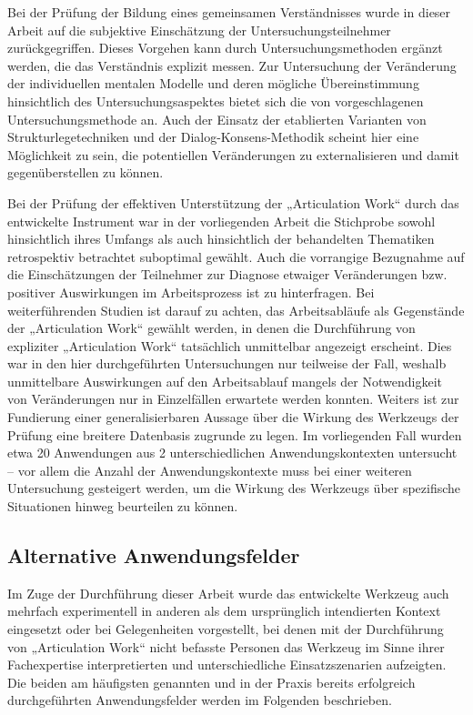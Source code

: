 Bei der Prüfung der Bildung eines gemeinsamen Verständnisses wurde in dieser Arbeit auf die subjektive Einschätzung der Untersuchungsteilnehmer zurückgegriffen. Dieses Vorgehen kann durch Untersuchungsmethoden ergänzt werden, die das Verständnis explizit messen. Zur Untersuchung der Veränderung der individuellen mentalen Modelle und deren mögliche Übereinstimmung hinsichtlich des Untersuchungsaspektes bietet sich die von \citep{Ifenthaler06} vorgeschlagenen Untersuchungsmethode an. Auch der Einsatz der etablierten Varianten von Strukturlegetechniken und der Dialog-Konsens-Methodik scheint hier eine Möglichkeit zu sein, die potentiellen Veränderungen zu externalisieren und damit gegenüberstellen zu können.

Bei der Prüfung der effektiven Unterstützung der „Articulation Work“ durch das entwickelte Instrument war in der vorliegenden Arbeit die Stichprobe sowohl hinsichtlich ihres Umfangs als auch hinsichtlich der behandelten Thematiken retrospektiv betrachtet suboptimal gewählt. Auch die vorrangige Bezugnahme auf die Einschätzungen der Teilnehmer zur Diagnose etwaiger Veränderungen bzw. positiver Auswirkungen im Arbeitsprozess ist zu hinterfragen. Bei weiterführenden Studien ist darauf zu achten, das Arbeitsabläufe als Gegenstände der „Articulation Work“ gewählt werden, in denen die Durchführung von expliziter „Articulation Work“ tatsächlich unmittelbar angezeigt erscheint. Dies war in den hier durchgeführten Untersuchungen nur teilweise der Fall, weshalb unmittelbare Auswirkungen auf den Arbeitsablauf mangels der Notwendigkeit von Veränderungen nur in Einzelfällen erwartete werden konnten. Weiters ist zur Fundierung einer generalisierbaren Aussage über die Wirkung des Werkzeugs der Prüfung eine breitere Datenbasis zugrunde zu legen. Im vorliegenden Fall wurden etwa 20 Anwendungen aus 2 unterschiedlichen Anwendungskontexten untersucht -- vor allem die Anzahl der Anwendungskontexte muss bei einer weiteren Untersuchung gesteigert werden, um die Wirkung des Werkzeugs über spezifische Situationen hinweg beurteilen zu können.


\subsection{Alternative Anwendungsfelder} %
\label{sub:alternative_anwendungsfelder}

Im Zuge der Durchführung dieser Arbeit wurde das entwickelte Werkzeug auch mehrfach experimentell in anderen als dem ursprünglich intendierten Kontext eingesetzt oder bei Gelegenheiten vorgestellt, bei denen mit der Durchführung von „Articulation Work“ nicht befasste Personen das Werkzeug im Sinne ihrer Fachexpertise interpretierten und unterschiedliche Einsatzszenarien aufzeigten. Die beiden am häufigsten genannten und in der Praxis bereits erfolgreich durchgeführten Anwendungsfelder werden im Folgenden beschrieben.

